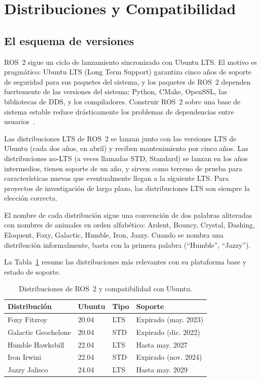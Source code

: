 \section{Distribuciones y Compatibilidad}

\subsection{El esquema de versiones}

ROS~2 sigue un ciclo de lanzamiento sincronizado con Ubuntu LTS. El motivo es pragmático: Ubuntu LTS (Long Term Support) garantiza cinco años de soporte de seguridad para sus paquetes del sistema, y los paquetes de ROS~2 dependen fuertemente de las versiones del sistema: Python, CMake, OpenSSL, las bibliotecas de DDS, y los compiladores. Construir ROS~2 sobre una base de sistema estable reduce drásticamente los problemas de dependencias entre usuarios~\cite{ros2releases}.

Las distribuciones LTS de ROS~2 se lanzan junto con las versiones LTS de Ubuntu (cada dos años, en abril) y reciben mantenimiento por cinco años. Las distribuciones no-LTS (a veces llamadas STD, Standard) se lanzan en los años intermedios, tienen soporte de un año, y sirven como terreno de prueba para características nuevas que eventualmente llegan a la siguiente LTS. Para proyectos de investigación de largo plazo, las distribuciones LTS son siempre la elección correcta.

El nombre de cada distribución sigue una convención de dos palabras aliteradas con nombres de animales en orden alfabético: Ardent, Bouncy, Crystal, Dashing, Eloquent, Foxy, Galactic, Humble, Iron, Jazzy. Cuando se nombra una distribución informalmente, basta con la primera palabra (``Humble'', ``Jazzy'').

La Tabla~\ref{tab:distros_detalle} resume las distribuciones más relevantes con su plataforma base y estado de soporte.

\begin{table}[H]
  \centering
  \caption{Distribuciones de ROS~2 y compatibilidad con Ubuntu.}
  \label{tab:distros_detalle}
  \begin{tabular}{@{}lllp{2.2cm}@{}}
    \toprule
    Distribución & Ubuntu & Tipo & Soporte \\
    \midrule
    Foxy Fitzroy        & 20.04 & LTS & Expirado (may. 2023) \\
    Galactic Geochelone & 20.04 & STD & Expirado (dic. 2022) \\
    Humble Hawksbill    & 22.04 & LTS & Hasta may. 2027 \\
    Iron Irwini         & 22.04 & STD & Expirado (nov. 2024) \\
    Jazzy Jalisco       & 24.04 & LTS & Hasta may. 2029 \\
    \bottomrule
  \end{tabular}
\end{table}

